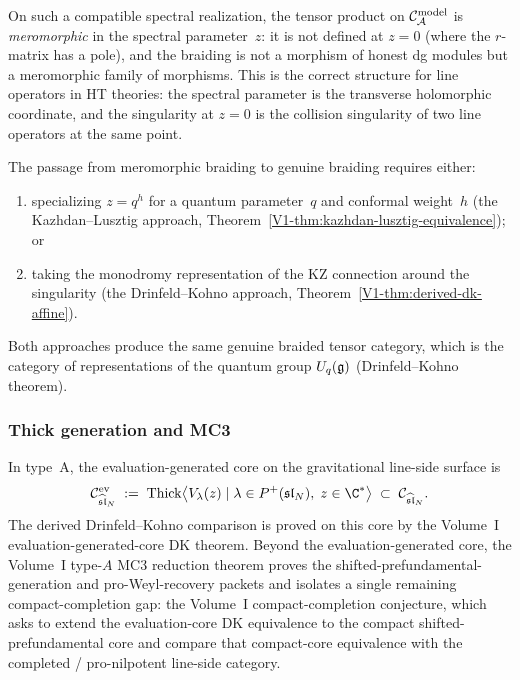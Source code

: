 \begin{remark}
On such a compatible spectral realization, the tensor product on
$\mathcal{C}_{\mathcal{A}}^{\mathrm{model}}$ is \emph{meromorphic} in the spectral
parameter~$z$: it is not defined at $z = 0$ (where the $r$-matrix
has a pole), and the braiding is not a morphism of honest dg modules
but a meromorphic family of morphisms. This is the correct structure
for line operators in HT theories: the spectral parameter is the
transverse holomorphic coordinate, and the singularity at $z = 0$ is
the collision singularity of two line operators at the same point.

The passage from meromorphic braiding to genuine braiding requires
either:
\begin{enumerate}[label=\textup{(\roman*)}]
\item specializing $z = q^h$ for a quantum parameter~$q$ and
 conformal weight~$h$ (the Kazhdan--Lusztig approach,
 Theorem~\ref{V1-thm:kazhdan-lusztig-equivalence}); or
\item taking the monodromy representation of the KZ connection
 around the singularity (the Drinfeld--Kohno approach,
 Theorem~\ref{V1-thm:derived-dk-affine}).
\end{enumerate}
Both approaches produce the same genuine braided tensor category,
which is the category of representations of the quantum group
$U_q(\mathfrak{g})$ (Drinfeld--Kohno theorem).
\end{remark}


\subsubsection{Thick generation and MC3}

\begin{theorem}
In type~A, the evaluation-generated core on the gravitational
line-side surface is
\begin{equation}%
\cC^{\mathrm{ev}}_{\widehat{\mathfrak{sl}}_N}
\;:=\;
\mathrm{Thick}\bigl\langle
 V_\lambda(z) \mid \lambda \in P^+(\mathfrak{sl}_N),\;
 z \in \C^*
\bigr\rangle
\;\subset\;
\cC_{\widehat{\mathfrak{sl}}_N}.
\end{equation}
The derived Drinfeld--Kohno comparison is proved on this core by the
Volume~I evaluation-generated-core DK theorem. Beyond the
evaluation-generated core, the Volume~I type-$A$ MC3 reduction theorem
proves the shifted-prefundamental-generation and pro-Weyl-recovery
packets and isolates a single remaining compact-completion gap:
the Volume~I compact-completion conjecture, which asks to extend the
evaluation-core DK equivalence to the compact shifted-prefundamental
core and compare that compact-core equivalence with the completed /
pro-nilpotent line-side category.
\end{theorem}

